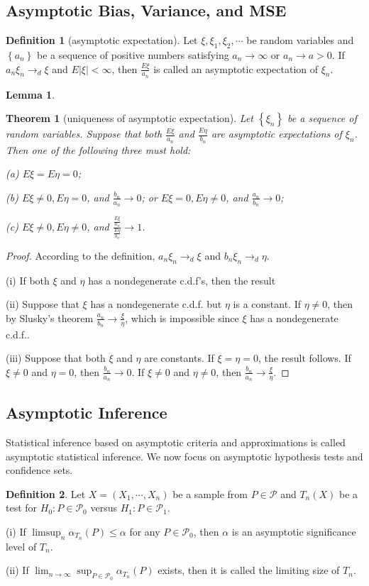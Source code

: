 \documentclass{article}
\newtheorem{Thm}{Theorem}[section]
\newtheorem{Lem}{Lemma}[section]
\theoremstyle{definition}
\newtheorem{Def}{Definition}[section]
\begin{document}
\subsection{Asymptotic Bias, Variance, and MSE}
\begin{Def}[asymptotic expectation]
Let $\xi,\xi_1,\xi_2,\cdots$ be random variables and $\left\{a_n\right\}$ be a sequence of positive numbers satisfying $a_n\to\infty$ or $a_n\to a>0$. If $a_n\xi_n\to_d\xi$ and $E\left|\xi\right|<\infty$, then $\frac{E\xi}{a_n}$ is called an asymptotic expectation of $\xi_n$.
\end{Def}
\begin{Lem}

\end{Lem}
\begin{Thm}[uniqueness of asymptotic expectation]
Let $\left\{\xi_n\right\}$ be a sequence of random variables. Suppose that both $\frac{E\xi}{a_n}$ and $\frac{E\eta}{b_n}$ are asymptotic expectations of $\xi_n$. Then one of the following three must hold:\par
(a) $E\xi=E\eta=0$;\par
(b) $E\xi\ne0,E\eta=0$, and $\frac{b_n}{a_n}\to0$; or $E\xi=0,E\eta\ne0$, and $\frac{a_n}{b_n}\to0$;\par
(c) $E\xi\ne0,E\eta\ne0$, and $\frac{\frac{E\xi}{a_n}}{\frac{E\eta}{b_n}}\to 1$.
\end{Thm}
\begin{proof}
According to the definition, $a_n\xi_n\to_d\xi$ and $b_n\xi_n\to_d\eta$.\par
(i) If both $\xi$ and $\eta$ has a nondegenerate c.d.f's, then the result \par
(ii) Suppose that $\xi$ has a nondegenerate c.d.f. but $\eta$ is a constant. If $\eta\ne0$, then by Slusky's theorem $\frac{a_n}{b_n}\to \frac{\xi}{\eta}$, which is impossible since $\xi$ has a nondegenerate c.d.f..\par
(iii) Suppose that both $\xi$ and $\eta$ are constants. If $\xi=\eta=0$, the result follows. If $\xi\ne0$ and $\eta=0$, then $\frac{b_n}{a_n}\to 0$. If $\xi\ne0$ and $\eta\ne0$, then $\frac{b_n}{a_n}\to  \frac{\xi}{\eta}$.
\end{proof}

\subsection{Asymptotic Inference}
Statistical inference based on asymptotic criteria and approximations is called asymptotic statistical inference. We now focus on asymptotic hypothesis tests and confidence sets.
\begin{Def}
Let $X=(X_1,\cdots,X_n)$ be a sample from $P\in\mathcal{P}$ and $T_n(X)$ be a test for $H_0:P\in\mathcal{P}_0$ versus $H_1:P\in\mathcal{P}_1$.\par
(i) If $\limsup_n \alpha_{T_n}(P)\le \alpha$ for any $P\in\mathcal{P}_0$, then $\alpha$ is an asymptotic significance level of $T_n$.\par
(ii) If $\lim_{n\to\infty} \sup_{P\in\mathcal{P}_0}\alpha_{T_n}(P)$ exists, then it is called the limiting size of $T_n$.\par

\end{Def}
\end{document}
